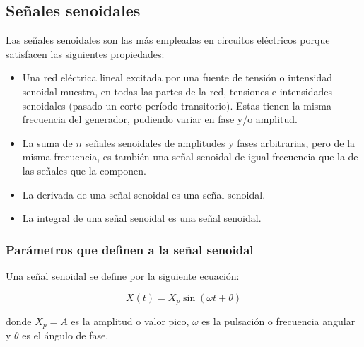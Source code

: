 \documentclass{article}
\begin{document}
    \subsection{Señales senoidales}

    Las señales senoidales son las más empleadas en circuitos eléctricos porque satisfacen las siguientes propiedades:

    \begin{itemize}
        \item Una red eléctrica lineal excitada por una fuente de tensión o intensidad senoidal muestra, en todas las partes de la red, tensiones e intensidades senoidales (pasado un corto período transitorio). Estas tienen la misma frecuencia del generador, pudiendo variar en fase y/o amplitud.
        \item La suma de $n$ señales senoidales de amplitudes y fases arbitrarias, pero de la misma frecuencia, es también una señal senoidal de igual frecuencia que la de las señales que la componen.
        \item La derivada de una señal senoidal es una señal senoidal.
        \item La integral de una señal senoidal es una señal senoidal.
    \end{itemize}

    \subsubsection{Parámetros que definen a la señal senoidal}

    Una señal senoidal se define por la siguiente ecuación:

    \begin{equation}
        X(t) = X_p \sin(\omega t + \theta)\label{eq:senoide}
    \end{equation}

    donde $X_p = A$ es la amplitud o valor pico, $\omega$ es la pulsación o frecuencia angular y $\theta$ es el ángulo de fase.
\end{document}
